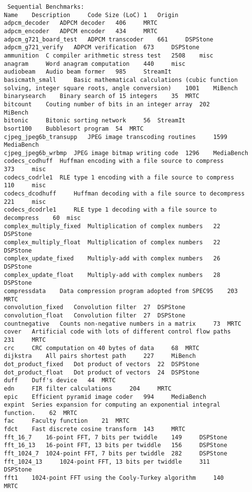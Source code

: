 \documentclass[a4paper,UKenglish]{oasics}
\begin{document}
\begin{verbatim}
 Sequential Benchmarks:
Name 	Description 	Code Size (LoC) 1 	Origin
adpcm_decoder 	ADPCM decoder 	406 	MRTC
adpcm_encoder 	ADPCM encoder 	434 	MRTC
adpcm_g721_board_test 	ADPCM transcoder 	661 	DSPStone
adpcm_g721_verify 	ADPCM verification 	673 	DSPStone
ammunition 	C compiler arithmetic stress test 	2508 	misc
anagram 	Word anagram computation 	440 	misc
audiobeam 	Audio beam former 	985 	StreamIt
basicmath_small 	Basic mathematical calculations (cubic function solving, integer square roots, angle conversion) 	1001 	MiBench
binarysearch 	Binary search of 15 integers 	35 	MRTC
bitcount 	Couting number of bits in an integer array 	202 	MiBench
bitonic 	Bitonic sorting network 	56 	StreamIt
bsort100 	Bubblesort program 	54 	MRTC
cjpeg_jpeg6b_transupp 	JPEG image transcoding routines 	1599 	MediaBench
cjpeg_jpeg6b_wrbmp 	JPEG image bitmap writing code 	1296 	MediaBench
codecs_codhuff 	Huffman encoding with a file source to compress 	373 	misc
codecs_codrle1 	RLE type 1 encoding with a file source to compress 	110 	misc
codecs_dcodhuff 	Huffman decoding with a file source to decompress 	221 	misc
codecs_dcodrle1 	RLE type 1 decoding with a file source to decompress 	60 	misc
complex_multiply_fixed 	Multiplication of complex numbers 	22 	DSPStone
complex_multiply_float 	Multiplication of complex numbers 	22 	DSPStone
complex_update_fixed 	Multiply-add with complex numbers 	26 	DSPStone
complex_update_float 	Multiply-add with complex numbers 	28 	DSPStone
compressdata 	Data compression program adopted from SPEC95 	203 	MRTC
convolution_fixed 	Convolution filter 	27 	DSPStone
convolution_float 	Convolution filter 	27 	DSPStone
countnegative 	Counts non-negative numbers in a matrix 	73 	MRTC
cover 	Artificial code with lots of different control flow paths 	231 	MRTC
crc 	CRC computation on 40 bytes of data 	68 	MRTC
dijkstra 	All pairs shortest path 	227 	MiBench
dot_product_fixed 	Dot product of vectors 	22 	DSPStone
dot_product_float 	Dot product of vectors 	24 	DSPStone
duff 	Duff's device 	44 	MRTC
edn 	FIR filter calculations 	204 	MRTC
epic 	Efficient pyramid image coder 	994 	MediaBench
expint 	Series expansion for computing an exponential integral function. 	62 	MRTC
fac 	Faculty function 	21 	MRTC
fdct 	Fast discrete cosine transform 	143 	MRTC
fft_16_7 	16-point FFT, 7 bits per twiddle 	149 	DSPStone
fft_16_13 	16-point FFT, 13 bits per twiddle 	156 	DSPStone
fft_1024_7 	1024-point FFT, 7 bits per twiddle 	282 	DSPStone
fft_1024_13 	1024-point FFT, 13 bits per twiddle 	311 	DSPStone
fft1 	1024-point FFT using the Cooly-Turkey algorithm 	140 	MRTC

\end{verbatim}
\end{document}
